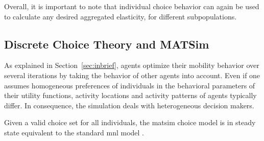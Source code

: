 Overall, it is important to note that individual choice behavior can again be used to calculate any desired aggregated elasticity, \eg for different subpopulations.

\subsection{Discrete Choice Theory and MATSim}
\label{ch:economicEval:describingBehavior:discreteChoice:matsim}
%
As explained in Section~\ref{sec:inbrief},
%
%
agents optimize their mobility behavior over several iterations by taking the behavior of other agents into account. Even if one assumes homogeneous preferences of individuals in the behavioral parameters of their utility functions, activity locations and activity patterns of agents typically differ. In consequence, the simulation deals with heterogeneous decision makers.

Given a valid choice set for all individuals, the \acrshort{matsim} choice model is in steady state equivalent to the standard \gls{mnl} model \citep{NagelFloetteroed2009IatbrResourceInBook}.

